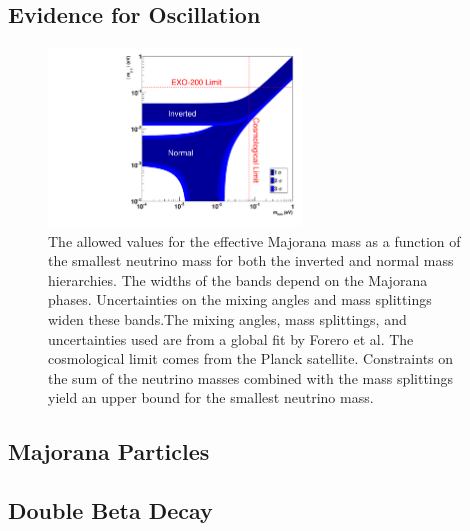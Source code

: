\documentclass[herrin-thesis.tex]{subfiles}
\begin{document}
\subsection{Evidence for Oscillation}
\begin{figure}
	\centering
	\includegraphics[width=0.6\textwidth]{./plots/nu_meff_v_mmin.pdf}
	\caption[Effective Majorana mass vs. smallest neutrino mass]{The allowed values for the effective Majorana mass as a function of the smallest neutrino mass for both the inverted and normal mass hierarchies. The widths of the bands depend on the Majorana phases. Uncertainties on the mixing angles and mass splittings widen these bands.The mixing angles, mass splittings, and uncertainties used are from a global fit by Forero et al.\cite{Forero:2012cr} The cosmological limit comes from the Planck satellite. Constraints on the sum of the neutrino masses combined with the mass splittings yield an upper bound for the smallest neutrino mass.}
	\label{fig:nu_meff_v_mmin}
\end{figure}\addref

\subsection{Majorana Particles}

\subsection{Double Beta Decay}
\end{document}

